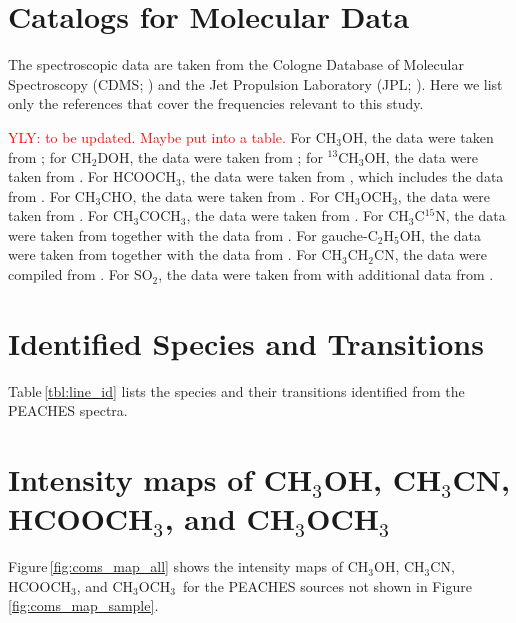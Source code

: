 \documentclass[twocolumn]{aastex62}
\newcommand{\methylformate}{\mbox{HCOOCH$_{3}$}}
\newcommand{\methanol}{\mbox{CH$_{3}$OH}}
\newcommand{\tmethanol}{\mbox{$^{13}$CH$_{3}$OH}}
\newcommand{\dmethanol}{\mbox{CH$_{2}$DOH}}
\newcommand{\dimethylether}{\mbox{CH$_{3}$OCH$_{3}$}}
\newcommand{\acetone}{\mbox{CH$_{3}$COCH$_{3}$}}
\newcommand{\ethanol}{\mbox{C$_{2}$H$_{5}$OH}}
\newcommand{\acetaldehyde}{\mbox{CH$_{3}$CHO}}
\newcommand{\ethylcyanide}{\mbox{CH$_{3}$CH$_{2}$CN}}
\newcommand{\methylcyanide}{\mbox{CH$_{3}$CN}}
\begin{document}


\appendix
\section{Catalogs for Molecular Data}
\label{sec:catalogs}
The spectroscopic data are taken from the Cologne Database of Molecular Spectroscopy (CDMS; \citealt{2001A&A...370L..49M,2005JMoSt.742..215M,2016JMoSp.327...95E}) and the Jet Propulsion Laboratory (JPL; \citealt{1998JQSRT..60..883P}).  Here we list only the references that cover the frequencies relevant to this study.  

\textcolor{red}{YLY: to be updated.  Maybe put into a table.}
For \methanol, the data were taken from \citet{2008JMoSp.251..305X}; for \dmethanol, the data were taken from \citet{2012JMoSp.280..119P}; for \tmethanol, the data were taken from \citet{1997JPCRD..26...17X}.  For \methylformate, the data were taken from \citet{2009JMoSp.255...32I}, which includes the data from \citet{1984ApJS...55..633P,1999ApJ...521..255O,2007JMoSp.246..158C,2008JMoSp.251..293M}.  For \acetaldehyde, the data were taken from \citet{1996JPCRD..25.1113K}.  For \dimethylether, the data were taken from \citet{2009A&A...504..635E}.  For \acetone, the data were taken from \citet{2002ApJS..142..145G}.  For CH$_{3}$C$^{15}$N, the data were taken from \citet{2009A&A...506.1487M} together with the data from \citet{1996ApJ...471.1067P}.  For gauche-\ethanol, the data were taken from \citet{2008JMoSp.251..394P} together with the data from \citet{1996JMoSp.175..246P}.  For \ethylcyanide, the data were compiled from \citet{1994ApJS...93..589P,2009ApJS..184..133B}.  For SO$_{2}$, the data were taken from \citet{2005JMoSp.232..213M} with additional data from \citet{1985JPCRD..14..395L,1985JMoSp.111...66H,1998JMoSp.191...17B}.


\newpage
\section{Identified Species and Transitions}
Table\,\ref{tbl:line_id} lists the species and their transitions identified from the PEACHES spectra.
\newpage


\section{Intensity maps of \methanol, \methylcyanide, \methylformate, and \dimethylether}
Figure\,\ref{fig:coms_map_all} shows the intensity maps of \methanol, \methylcyanide, \methylformate, and \dimethylether\ for the PEACHES sources not shown in Figure\,\ref{fig:coms_map_sample}.
\label{sec:coms_maps}

\end{document}
